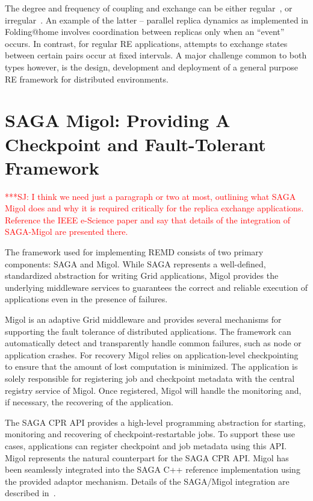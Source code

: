\documentclass{rspublic}
\newcommand{\jhanote}[1]{ {\textcolor{red} { ***SJ: #1 }}}
\newcommand{\jhanote}[1]{}
\begin{document}
The degree and frequency of coupling and exchange can be either
regular~\citep{hansmann,Sugita:1999rm}, or
irregular~\citep{SPdynamics,pande_bj03}. An example of the latter --
parallel replica dynamics as implemented in Folding@home involves
coordination between replicas only when an ``event'' occurs.  In
contrast, for regular RE applications, attempts to exchange states
between certain pairs occur at fixed intervals. A major challenge
common to both types however, is the design, development and
deployment of a general purpose RE framework for distributed
environments.

\section{SAGA Migol: Providing A Checkpoint and Fault-Tolerant
  Framework}\label{sec:sagamigol}

\jhanote{I think we need just a paragraph or two at most, outlining
  what SAGA Migol does and why it is required critically for the
  replica exchange applications. Reference the IEEE e-Science paper
  and say that details of the integration of SAGA-Migol are presented
  there.}

The framework used for implementing REMD consists of two  primary components: SAGA and Migol.     
While SAGA represents a well-defined, standardized abstraction for writing Grid applications,
Migol provides the underlying middleware services to guarantees the correct and reliable exe\-cution of applications
even in the presence of failures.
    

Migol is an  adaptive Grid middleware and provides several mechanisms for supporting the fault tolerance
of distributed applications. The framework can automatically detect and transparently handle common failures, 
such as node or application crashes. For recovery Migol relies on application-level checkpointing 
to ensure that the amount of lost computation is minimized. The 
application is solely responsible for registering job and checkpoint metadata with the central registry service
of Migol. Once registered, Migol will handle the monitoring and, if necessary, the recovering of the application.

The SAGA CPR API provides a high-level programming abstraction for starting, monitoring and recovering
of checkpoint-restartable jobs. To support these use cases, applications can register
checkpoint and job metadata using this API. Migol represents the natural counterpart
for the SAGA CPR API. Migol has been seamlessly integrated into the SAGA C++ reference implementation
using the provided adaptor mechanism. Details of the SAGA/Migol integration are described in~\citet{Luckow:2008la}.
\end{document}
